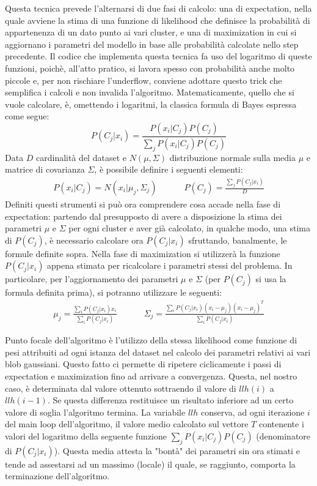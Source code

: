 \documentclass[]{report}
\begin{document}
	Questa tecnica prevede l'alternarsi di due fasi di calcolo: una di expectation, nella quale avviene la stima di una funzione di likelihood che definisce la probabilità di appartenenza di un dato punto ai vari cluster, e una di maximization in cui si aggiornano i parametri del modello in base alle probabilità calcolate nello step precedente.  
	Il codice che implementa questa tecnica fa uso del logaritmo di queste funzioni, poichè, all'atto pratico, si lavora spesso con probabilità anche molto piccole e, per non rischiare l'underflow, conviene adottare questo trick che semplifica i calcoli e non invalida l'algoritmo. 
	Matematicamente, quello che si vuole calcolare, è, omettendo i logaritmi, la classica formula di Bayes espressa come segue:
	$$ P(C_j|x_i) = \frac{ P(x_i|C_j)P(C_j)}{\sum_{j} P(x_i|C_j)P(C_j)} $$
	Data $D$ cardinalità del dataset e $N(\mu,\Sigma)$ distribuzione normale sulla media $\mu$ e matrice di covarianza $\Sigma$, è possibile definire i seguenti elementi: 
	$$ \begin{matrix}
		P(x_i|C_j) = N(x_i|\mu_j,\Sigma_j) & ~~~~~~~ & P(C_j) = \frac{\sum_{j} P(C_j|x_i)}{D}
	\end{matrix}$$ 
	Definiti questi strumenti si può ora comprendere cosa accade nella fase di expectation: partendo dal presupposto di avere a disposizione la stima dei parametri $\mu$ e $\Sigma$ per ogni cluster e aver già calcolato, in qualche modo, una stima di $P(C_j)$, è necessario calcolare ora $P(C_j|x_i)$ sfruttando, banalmente, le formule definite sopra.
	Nella fase di maximization si utilizzerà la funzione $P(C_j|x_i)$ appena stimata per ricalcolare i parametri stessi del problema. In particolare, per l'aggiornamento dei parametri $\mu$ e $\Sigma$ (per $P(C_j)$ si usa la formula definita prima), si potranno utilizzare le seguenti:
	$$ \begin{matrix}
		\mu_j = \frac{\sum_{i} P(C_j|x_i)x_i}{\sum_{i} P(C_j|x_i)} & ~~~~~~~ & \Sigma_j = \frac{\sum_{i} P(C_j|x_i)(x_i-\mu_j)(x_i-\mu_j)^{T}}{\sum_{i} P(C_j|x_i)}
	\end{matrix}$$ 

	Punto focale dell'algoritmo è l'utilizzo della stessa likelihood come funzione di pesi attribuiti ad ogni istanza del dataset nel calcolo dei parametri relativi ai vari blob gaussiani. Questo fatto ci permette di ripetere ciclicamente i passi di expectation e maximization fino ad arrivare a convergenza. Questa, nel nostro caso, è determinata dal valore ottenuto sottraendo il valore di $llh(i)$ a $llh(i-1)$. Se questa differenza restituisce un risultato inferiore ad un certo valore di soglia l'algoritmo termina. La variabile $llh$ conserva, ad ogni iterazione $i$ del main loop dell'algoritmo, il valore medio calcolato sul vettore $T$ contenente i valori del logaritmo della seguente funzione $\sum_{j} P(x_i|C_j)P(C_j)$ (denominatore di $P(C_j|x_i)$). Questa media attesta la "bontà" dei parametri sin ora stimati e tende ad assestarsi ad un massimo (locale) il quale, se raggiunto, comporta la terminazione dell'algoritmo.
	   
\end{document}
